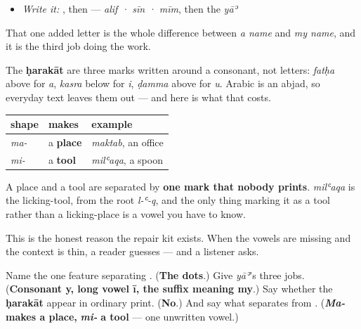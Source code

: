 \begin{itemize}
\raggedright
  \item \emph{Write it:} \textbf{}, then \textbf{} — \emph{alif · sīn · mīm}, then the \emph{yāʾ}
\end{itemize}

That one added letter is the whole difference between \emph{a name} and \emph{my name}, and it is the third job doing the work.

\begin{grammarlens}[title={Grammar Lens: one unwritten vowel, two different words}]
The \textbf{ḥarakāt} are three marks written around a consonant, not letters: \emph{fatḥa} above for \emph{a}, \emph{kasra} below for \emph{i}, \emph{ḍamma} above for \emph{u}. Arabic is an abjad, so everyday text leaves them out — and here is what that costs.

\noindent
\begin{tabularx}{\linewidth}{@{}>{\raggedright\arraybackslash}X>{\raggedright\arraybackslash}X>{\raggedright\arraybackslash}X@{}}
\toprule
\textbf{shape} & \textbf{makes} & \textbf{example} \\
\midrule
\textbf{\ar{مَـ}} \emph{ma-} & a \textbf{place} & \emph{maktab}, an office \\
\textbf{\ar{مِـ}} \emph{mi-} & a \textbf{tool} & \emph{milʿaqa}, a spoon \\
\bottomrule
\end{tabularx}

A place and a tool are separated by \textbf{one mark that nobody prints}. \emph{milʿaqa} is the licking-tool, from the root \emph{l-ʿ-q}, and the only thing marking it as a tool rather than a licking-place is a vowel you have to know.

This is the honest reason the repair kit exists. When the vowels are missing and the context is thin, a reader guesses — and a listener asks.
\end{grammarlens}

\begin{tcolorbox}[breakable,colback=teal!4,colframe=teal!35!black,title={Before you move on}]
Name the one feature separating \textbf{   }. (\textbf{The dots}.) Give \emph{yāʾ}'s three jobs. (\textbf{Consonant y, long vowel ī, the suffix meaning my}.) Say whether the \textbf{ḥarakāt} appear in ordinary print. (\textbf{No}.) And say what separates \textbf{} from \textbf{}. (\emph{\textbf{Ma-}} \textbf{makes a place,} \emph{\textbf{mi-}} \textbf{a tool} — one unwritten vowel.)
\end{tcolorbox}
